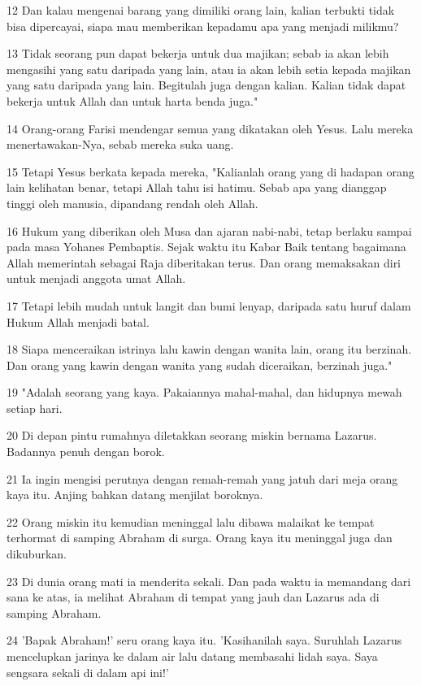 \par 12 Dan kalau mengenai barang yang dimiliki orang lain, kalian terbukti tidak bisa dipercayai, siapa mau memberikan kepadamu apa yang menjadi milikmu?
\par 13 Tidak seorang pun dapat bekerja untuk dua majikan; sebab ia akan lebih mengasihi yang satu daripada yang lain, atau ia akan lebih setia kepada majikan yang satu daripada yang lain. Begitulah juga dengan kalian. Kalian tidak dapat bekerja untuk Allah dan untuk harta benda juga."
\par 14 Orang-orang Farisi mendengar semua yang dikatakan oleh Yesus. Lalu mereka menertawakan-Nya, sebab mereka suka uang.
\par 15 Tetapi Yesus berkata kepada mereka, "Kalianlah orang yang di hadapan orang lain kelihatan benar, tetapi Allah tahu isi hatimu. Sebab apa yang dianggap tinggi oleh manusia, dipandang rendah oleh Allah.
\par 16 Hukum yang diberikan oleh Musa dan ajaran nabi-nabi, tetap berlaku sampai pada masa Yohanes Pembaptis. Sejak waktu itu Kabar Baik tentang bagaimana Allah memerintah sebagai Raja diberitakan terus. Dan orang memaksakan diri untuk menjadi anggota umat Allah.
\par 17 Tetapi lebih mudah untuk langit dan bumi lenyap, daripada satu huruf dalam Hukum Allah menjadi batal.
\par 18 Siapa menceraikan istrinya lalu kawin dengan wanita lain, orang itu berzinah. Dan orang yang kawin dengan wanita yang sudah diceraikan, berzinah juga."
\par 19 "Adalah seorang yang kaya. Pakaiannya mahal-mahal, dan hidupnya mewah setiap hari.
\par 20 Di depan pintu rumahnya diletakkan seorang miskin bernama Lazarus. Badannya penuh dengan borok.
\par 21 Ia ingin mengisi perutnya dengan remah-remah yang jatuh dari meja orang kaya itu. Anjing bahkan datang menjilat boroknya.
\par 22 Orang miskin itu kemudian meninggal lalu dibawa malaikat ke tempat terhormat di samping Abraham di surga. Orang kaya itu meninggal juga dan dikuburkan.
\par 23 Di dunia orang mati ia menderita sekali. Dan pada waktu ia memandang dari sana ke atas, ia melihat Abraham di tempat yang jauh dan Lazarus ada di samping Abraham.
\par 24 'Bapak Abraham!' seru orang kaya itu. 'Kasihanilah saya. Suruhlah Lazarus mencelupkan jarinya ke dalam air lalu datang membasahi lidah saya. Saya sengsara sekali di dalam api ini!'

